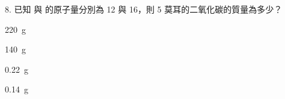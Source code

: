 \documentclass[12pt]{article}
\begin{document}
\begin{problem}
  \item[8.] 已知  與  的原子量分別為 12 與 16，則 5 莫耳的二氧化碳的質量為多少？
  \begin{choices}
    \item \qty{220}{g}
    \item \qty{140}{g}
    \item \qty{0.22}{g}
    \item \qty{0.14}{g}
  \end{choices}
\end{problem}
\end{document}
